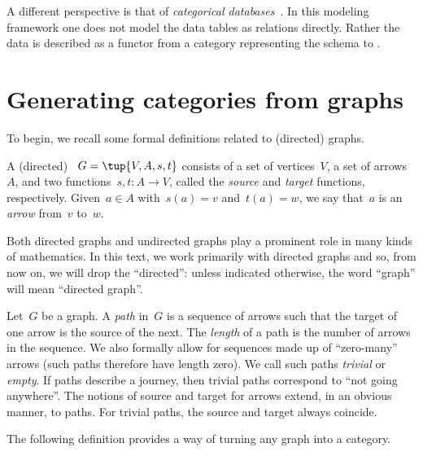 A different perspective is that of \emph{categorical databases}~\cite{spivak2019categorical}. In this modeling framework
one does not model the data tables as relations directly.
Rather the data is described as a functor
from a category representing the schema
to \Set.

\section{Generating categories from graphs}
\label{sec:catsfromgraphs}
To begin, we recall some formal definitions related to (directed) graphs.


\begin{definition}[Graph]
  A (directed) \emph{}~$G=\tup{V,A,s,t}$ consists of a set of vertices~$V$, a set of arrows~$A$, and two functions~$s,t\colon A\to V$, called the \emph{source} and \emph{target} functions, respectively. Given~$a\in A$ with~$s(a)=v$ and~$t(a)=w$, we say that~$a$ is an \emph{arrow} from~$v$ to~$w$.
\end{definition}

\begin{remark}
  Both directed graphs and undirected graphs play a prominent role in many kinds of mathematics. In this text, we work primarily with directed graphs and so, from now on, we will drop the ``directed'': unless indicated otherwise, the word ``graph'' will mean ``directed graph''.
\end{remark}

\begin{definition}[Paths]
  Let~$G$ be a graph. A \emph{path} in~$G$ is a sequence of arrows such that the target of one arrow is the source of the next. The \emph{length} of a path is the number of arrows in the sequence. We also formally allow for sequences made up of ``zero-many'' arrows (such paths therefore have length zero). We call such paths \emph{trivial} or \emph{empty}. If paths describe a journey, then trivial paths correspond to ``not going anywhere''. The notions of source and target for arrows extend, in an obvious manner, to paths. For trivial paths, the source and target always coincide.
\end{definition}

The following definition provides a way of turning any graph into a category.

